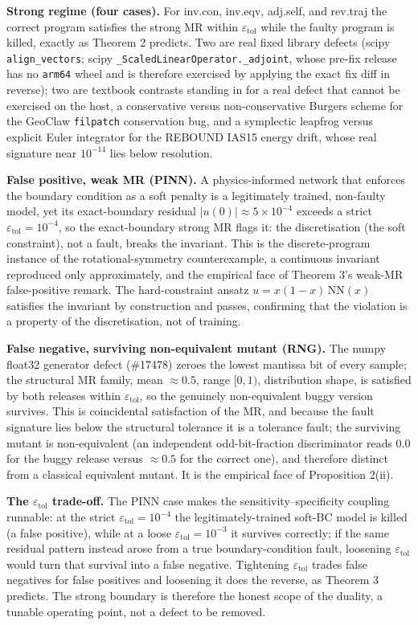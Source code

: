\documentclass[manuscript,screen,review]{acmart}
\begin{document}
\textbf{Strong regime (four cases).} For inv.con, inv.eqv, adj.self, and
rev.traj the correct program satisfies the strong MR within
$\varepsilon_{\mathrm{tol}}$ while the faulty program is killed, exactly
as Theorem 2 predicts. Two are real fixed library defects (scipy
\texttt{align\_vectors}; scipy \texttt{\_ScaledLinearOperator.\_adjoint},
whose pre-fix release has no \texttt{arm64} wheel and is therefore
exercised by applying the exact fix diff in reverse); two are textbook
contrasts standing in for a real defect that cannot be exercised on the
host, a conservative versus non-conservative Burgers scheme for the
GeoClaw \texttt{filpatch} conservation bug, and a symplectic leapfrog
versus explicit Euler integrator for the REBOUND IAS15 energy drift, whose
real signature near $10^{-14}$ lies below resolution.

\textbf{False positive, weak MR (PINN).} A physics-informed network
that enforces the boundary condition as a soft penalty is a legitimately
trained, non-faulty model, yet its exact-boundary residual
$|u(0)| \approx 5\times10^{-4}$ exceeds a strict
$\varepsilon_{\mathrm{tol}} = 10^{-4}$, so the exact-boundary strong MR
flags it: the discretisation (the soft constraint), not a fault, breaks
the invariant. This is the discrete-program instance of the
rotational-symmetry counterexample, a continuous invariant reproduced
only approximately, and the empirical face of Theorem 3's weak-MR
false-positive remark. The
hard-constraint ansatz $u = x(1-x)\,\mathrm{NN}(x)$ satisfies the invariant
by construction and passes, confirming that the violation is a property of
the discretisation, not of training.

\textbf{False negative, surviving non-equivalent mutant (RNG).} The
numpy float32 generator defect (\#17478) zeroes the lowest mantissa bit of
every sample; the structural MR family, mean $\approx 0.5$, range
$[0,1)$, distribution shape, is satisfied by both releases within
$\varepsilon_{\mathrm{tol}}$, so the genuinely non-equivalent buggy version
survives. This is coincidental satisfaction of the MR, and because the
fault signature lies below the structural tolerance it is a tolerance
fault; the surviving mutant is non-equivalent (an independent
odd-bit-fraction discriminator reads $0.0$ for the buggy release versus
$\approx 0.5$ for the correct one), and therefore distinct from a
classical equivalent mutant. It is the empirical face of Proposition
2(ii).

\textbf{The $\varepsilon_{\mathrm{tol}}$ trade-off.} The PINN case makes
the sensitivity--specificity coupling runnable: at the strict
$\varepsilon_{\mathrm{tol}} = 10^{-4}$ the legitimately-trained soft-BC
model is killed (a false positive), while at a loose
$\varepsilon_{\mathrm{tol}} = 10^{-3}$ it survives correctly; if the same
residual pattern instead arose from a true boundary-condition fault,
loosening $\varepsilon_{\mathrm{tol}}$ would turn that survival into a
false negative. Tightening
$\varepsilon_{\mathrm{tol}}$ trades false negatives for false positives and
loosening it does the reverse, as Theorem 3 predicts. The strong
boundary is therefore the honest scope of the duality, a tunable
operating point, not a defect to be removed.
\end{document}
